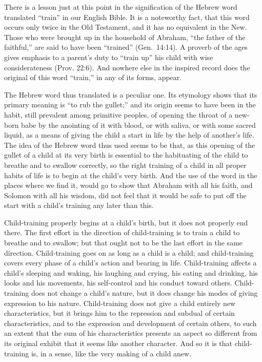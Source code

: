 \documentclass[
]{book}
\begin{document}
There is a lesson just at this point in the signification of the Hebrew word translated ``train'' in our English Bible. It is a noteworthy fact, that this word occurs only twice in the Old Testament, and it has no equivalent in the New. Those who were brought up in the household of Abraham, ``the father of the faithful,'' are said to have been ``trained'' (Gen.~14:14). A proverb of the ages gives emphasis to a parent's duty to ``train up'' his child with wise considerateness (Prov. 22:6). And nowhere else in the inspired record does the original of this word ``train,'' in any of its forms, appear.

The Hebrew word thus translated is a peculiar one. Its etymology shows that its primary meaning is ``to rub the gullet;'' and its origin seems to have been in the habit, still prevalent among primitive peoples, of opening the throat of a new-born babe by the anointing of it with blood, or with saliva, or with some sacred liquid, as a means of giving the child a start in life by the help of another's life. The idea of the Hebrew word thus used seems to be that, as this opening of the gullet of a child at its very birth is essential to the habituating of the child to breathe and to swallow correctly, so the right training of a child in all proper habits of life is to begin at the child's very birth. And the use of the word in the places where we find it, would go to show that Abraham with all his faith, and Solomon with all his wisdom, did not feel that it would be safe to put off the start with a child's training any later than this.

Child-training properly begins at a child's birth, but it does not properly end there. The first effort in the direction of child-training is to train a child to breathe and to swallow; but that ought not to be the last effort in the same direction. Child-training goes on as long as a child is a child; and child-training covers every phase of a child's action and bearing in life. Child-training affects a child's sleeping and waking, his laughing and crying, his eating and drinking, his looks and his movements, his self-control and his conduct toward others. Child-training does not change a child's nature, but it does change his modes of giving expression to his nature. Child-training does not give a child entirely new characteristics, but it brings him to the repression and subdual of certain characteristics, and to the expression and development of certain others, to such an extent that the sum of his characteristics presents an aspect so different from its original exhibit that it seems like another character. And so it is that child-training is, in a sense, like the very making of a child anew.
\end{document}
